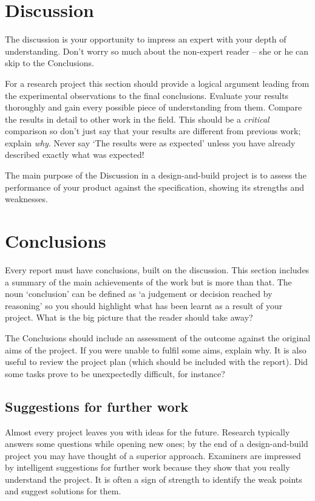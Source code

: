\documentclass[a4paper,12pt]{article}
\begin{document}
\section{Discussion}

The discussion is your opportunity to impress an expert with your depth of understanding. Don't worry so much about the non-expert reader -- she or he can skip to the Conclusions.

For a research project this section should provide a logical argument leading from the experimental observations to the final conclusions. Evaluate your results thoroughly and gain every possible piece of understanding from them. Compare the results in detail to other work in the field. This should be a \emph{critical} comparison so don't just say that your results are different from previous work; explain \emph{why}. Never say `The results were as expected' unless you have already described exactly what was expected!

The main purpose of the Discussion in a design-and-build project is to assess the performance of your product against the specification, showing its strengths and weaknesses.


\section{Conclusions}

Every report must have conclusions, built on the discussion. This section includes a summary of the main achievements of the work but is more than that. The noun `conclusion' can be defined as `a judgement or decision reached by reasoning' \cite{oupconc} so you should highlight what has been learnt as a result of your project. What is the big picture that the reader should take away? 

The Conclusions should include an assessment of the outcome against the original aims of the project. If you were unable to fulfil some aims, explain why. It is also useful to review the project plan (which should be included with the report). Did some tasks prove to be unexpectedly difficult, for instance?

\subsection{Suggestions for further work}

Almost every project leaves you with ideas for the future. Research typically answers some questions while opening new ones; by the end of a design-and-build project you may have thought of a superior approach. Examiners are impressed by intelligent suggestions for further work because they show that you really understand the project. It is often a sign of strength to identify the weak points and suggest solutions for them.
\end{document}

